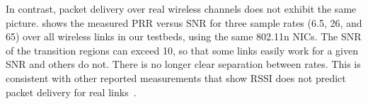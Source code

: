 In contrast, packet delivery over real wireless channels does not exhibit the same picture.  shows the measured PRR versus SNR for three sample rates (6.5, 26, and 65\Mbps) over all wireless links in our testbeds, using the same 802.11n NICs. The SNR of the transition regions can exceed 10\dB, so that some links easily work for a given SNR and others do not. There is no longer clear separation between rates. This is consistent with other reported measurements that show RSSI does not predict packet delivery for real links~\cite{aguayo_roofnet, reis_sigcomm06, snr_infocom08, zhao_sensys03}.

\ifx\mainfile\undefined

\fi
